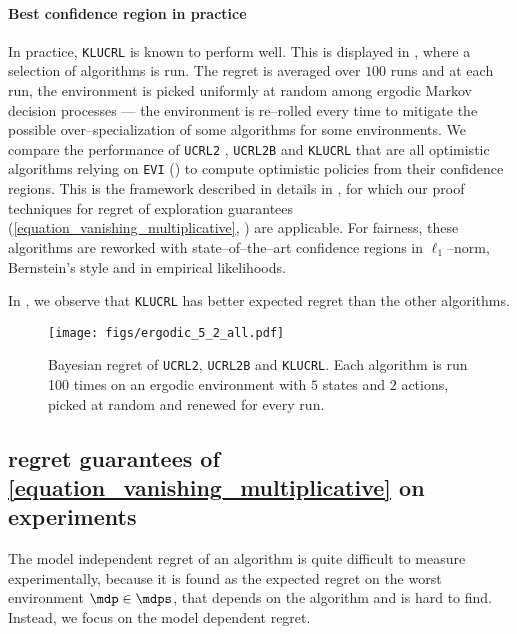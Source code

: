 \documentclass[preprint,cleveref,12pt]{colt2025}
\def\model{\mdp}
\def\models{\mdps}
\begin{document}
    \paragraph{Best confidence region in practice}
    In practice, \texttt{KLUCRL} is known to perform well. 
    This is displayed in , where a selection of algorithms is run. 
    The regret is averaged over $100$ runs and at each run, the environment is picked uniformly at random among ergodic Markov decision processes --- the environment is re--rolled every time to mitigate the possible over--specialization of some algorithms for some environments. 
    We compare the performance of \texttt{UCRL2} \cite{auer_near_optimal_2009}, \texttt{UCRL2B} \cite{fruit_improved_2020} and \texttt{KLUCRL} \cite{filippi_optimism_2010} that are all optimistic algorithms relying on \texttt{EVI} () to compute optimistic policies from their confidence regions.
    This is the framework described in details in , for which our proof techniques for regret of exploration guarantees (\eqref{equation_vanishing_multiplicative}, ) are applicable. 
    For fairness, these algorithms are reworked with state--of--the--art confidence regions in $\ell_1$--norm, Bernstein's style and in empirical likelihoods. 

    In , we observe that \texttt{KLUCRL} has better expected regret than the other algorithms. 

    \begin{figure}[h]
        \centering
        \texttt{[image: figs/ergodic\_5\_2\_all.pdf]}
        \caption{
            \label{figure_comparison_regret_all}
            Bayesian regret of \texttt{UCRL2}, \texttt{UCRL2B} and \texttt{KLUCRL}. 
            Each algorithm is run 100 times on an ergodic environment with $5$ states and $2$ actions, picked at random and renewed for every run. 
        }
    \end{figure}

    \subsection{regret guarantees of \eqref{equation_vanishing_multiplicative} on experiments}
    \label{appendix_experiments_regret}

    The model independent regret of an algorithm is quite difficult to measure experimentally, because it is found as the expected regret on the worst environment $\model \in \models$, that depends on the algorithm and is hard to find. 
    Instead, we focus on the model dependent regret. 
\end{document}
